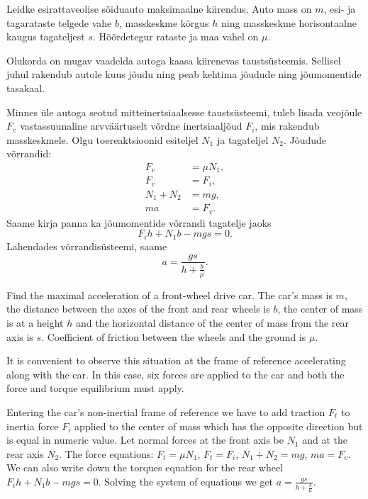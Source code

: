 
Leidke esirattaveolise sõiduauto maksimaalne kiirendus. Auto mass on $m$, esi- ja tagarataste telgede vahe $b$, masskeskme kõrgus $h$ ning masskeskme horisontaalne kaugus tagateljest $s$. Hõõrdetegur rataste ja maa vahel on $\mu$.

\hint
Olukorda on mugav vaadelda autoga kaasa kiirenevas taustsüsteemis. Sellisel juhul rakendub autole kuus jõudu ning peab kehtima jõudude ning jõumomentide tasakaal.

\solu
Minnes üle autoga seotud mitteinertsiaalsesse taustsüsteemi, tuleb lisada veojõule $F_v$ vastassuunaline arvväärtuselt võrdne inertsiaaljõud $F_i$, mis rakendub masskeskmele. Olgu toereaktsioonid esiteljel $N_1$ ja tagateljel $N_2$. Jõudude võrrandid:
\[
\begin{aligned}
F_v&=\mu N_1,\\
F_v&=F_i,\\
N_1+N_2&=mg,\\
ma&=F_v. 
\end{aligned}
\]
Saame kirja panna ka jõumomentide võrrandi tagatelje jaoks 
\[
F_ih+N_1b-mgs=0.
\]
Lahendades võrrandisüsteemi, saame
\[
a=\frac{gs}{h+\frac{b}{\mu}}.
\]

Find the maximal acceleration of a front-wheel drive car. The car’s mass is $m$, the distance between the axes of the front and rear wheels is $b$, the center of mass is at a height $h$ and the horizontal distance of the center of mass from the rear axis is $s$. Coefficient of friction between the wheels and the ground is $\mu$.

\hinteng
It is convenient to observe this situation at the frame of reference accelerating along with the car. In this case, six forces are applied to the car and both the force and torque equilibrium must apply.

\solueng
Entering the car’s non-inertial frame of reference we have to add traction $F_t$ to inertia force $F_i$ applied to the center of mass which has the opposite direction but is equal in numeric value. Let normal forces at the front axis be $N_1$ and at the rear axis $N_2$. The force equations: $F_t=\mu N_1$, $F_t=F_i$, $N_1+N_2=mg$, $ma=F_v$. We can also write down the torques equation for the rear wheel $F_ih+N_1b-mgs=0$. Solving the system of equations we get $a=\frac{gs}{h+\frac{b}{\mu}}$.
\probend